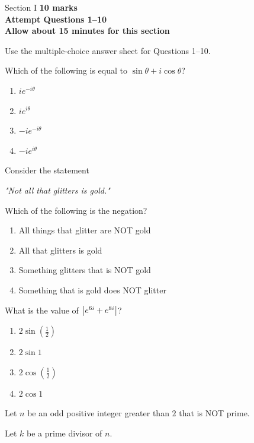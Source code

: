 \documentclass[12pt]{extarticle}
\begin{document}


\begin{sectionheader}{Section I}
	\textbf{10 marks\\
		Attempt Questions 1--10\\
		Allow about 15 minutes for this section}

	Use the multiple-choice answer sheet for Questions 1--10.
\end{sectionheader}
\begin{multiplechoice}
	\item Which of the following is equal to $\sin\theta+i\cos\theta$?
	\begin{enumerate}
		\item $ie^{-i\theta}$
		\item $ie^{i\theta}$
		\item $-ie^{-i\theta}$
		\item $-ie^{i\theta}$
	\end{enumerate}

	\item Consider the statement
	\begin{center}
		\textit{"Not all that glitters is gold."}
	\end{center}
	Which of the following is the negation?

	\begin{enumerate}
		\item All things that glitter are NOT gold
		\item All that glitters is gold
		\item Something glitters that is NOT gold
		\item Something that is gold does NOT glitter
	\end{enumerate}

	\item What is the value of $\abs{e^{6i}+e^{8i}}$?
	\begin{enumerate}
		\item $2\sin(\frac{1}{2})$
		\item $2\sin 1$
		\item $2\cos(\frac{1}{2})$
		\item $2\cos 1$
	\end{enumerate}

	\pagebreak
	\item Let $n$ be an odd positive integer greater than $2$ that is NOT prime.

	Let $k$ be a prime divisor of $n$.


\end{multiplechoice}
\end{document}
